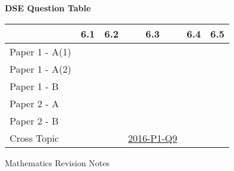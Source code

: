 \documentclass[12pt, a4paper]{article}
\begin{document}
\begin{absolutelynopagebreak}
\begin{center}
\textbf{DSE Question Table}
\end{center}
\begin{center}
\begin{tabular}{|l|c|c|c|c|c|}
\hline
        & 6.1 & 6.2 & 6.3 & 6.4 & 6.5 \\\hline
\hline
Paper 1 - A(1)&  &  &  &  &  \\
\hline
Paper 1 - A(2)&  &  &  &  &  \\
\hline
Paper 1 - B&  &  &  &  &  \\
\hline
\hline
Paper 2 - A&  &  &  &  &  \\
\hline
Paper 2 - B&  &  &  &  &  \\
\hline
\hline
Cross Topic&  &  & \hyperref[DSE2016-CoreP1-Q09]{2016-P1-Q9} &  &  \\
\hline
\end{tabular}
\end{center}
\end{absolutelynopagebreak}
\newpage
\newpage
\thispagestyle{empty}
\begin{center}
Mathematics Revision Notes\\\vspace{1cm}
\\\vspace{1cm}
{\fontsize{24pt}{24pt}\selectfont {Linear Equations in Two Unknowns}} \\\vspace{1cm}
\label{chapter:S2-7}

\end{center}
\vspace{0.5cm}
\hline
\end{document}
